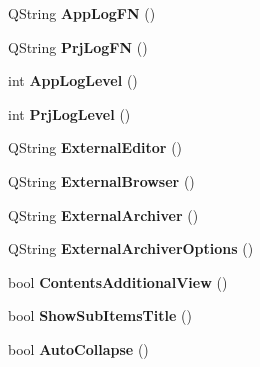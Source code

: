 \begin{DoxyCompactItemize}
\item 
\hypertarget{classConfig_a3cfd66219765c8b85864fa7e5c5fb755}{
QString {\bfseries AppLogFN} ()}
\label{classConfig_a3cfd66219765c8b85864fa7e5c5fb755}

\item 
\hypertarget{classConfig_a29e7bc799ca77942d52ce2f53dc22eb1}{
QString {\bfseries PrjLogFN} ()}
\label{classConfig_a29e7bc799ca77942d52ce2f53dc22eb1}

\item 
\hypertarget{classConfig_a9c84e77bd8ff25e3108587a0422eda6a}{
int {\bfseries AppLogLevel} ()}
\label{classConfig_a9c84e77bd8ff25e3108587a0422eda6a}

\item 
\hypertarget{classConfig_a7733a2196d72dbcfa1a22969e8eb35e9}{
int {\bfseries PrjLogLevel} ()}
\label{classConfig_a7733a2196d72dbcfa1a22969e8eb35e9}

\item 
\hypertarget{classConfig_aff79f9198f2139d28bd356f21308133a}{
QString {\bfseries ExternalEditor} ()}
\label{classConfig_aff79f9198f2139d28bd356f21308133a}

\item 
\hypertarget{classConfig_a394efa8dae02479f1b77aed136fce9a4}{
QString {\bfseries ExternalBrowser} ()}
\label{classConfig_a394efa8dae02479f1b77aed136fce9a4}

\item 
\hypertarget{classConfig_a37d4376b28bab63d4d2cbef0cd15732b}{
QString {\bfseries ExternalArchiver} ()}
\label{classConfig_a37d4376b28bab63d4d2cbef0cd15732b}

\item 
\hypertarget{classConfig_ace7d0feb3fe0358f631c36f688dca9b2}{
QString {\bfseries ExternalArchiverOptions} ()}
\label{classConfig_ace7d0feb3fe0358f631c36f688dca9b2}

\item 
\hypertarget{classConfig_a10a5ed939eca0c8380d31fd4fafd2d03}{
bool {\bfseries ContentsAdditionalView} ()}
\label{classConfig_a10a5ed939eca0c8380d31fd4fafd2d03}

\item 
\hypertarget{classConfig_a26d65cc7522f38541fc6b79dd0a16faf}{
bool {\bfseries ShowSubItemsTitle} ()}
\label{classConfig_a26d65cc7522f38541fc6b79dd0a16faf}

\item 
\hypertarget{classConfig_a349ea9d582084804fafe1797e9606802}{
bool {\bfseries AutoCollapse} ()}
\label{classConfig_a349ea9d582084804fafe1797e9606802}


\end{DoxyCompactItemize}
